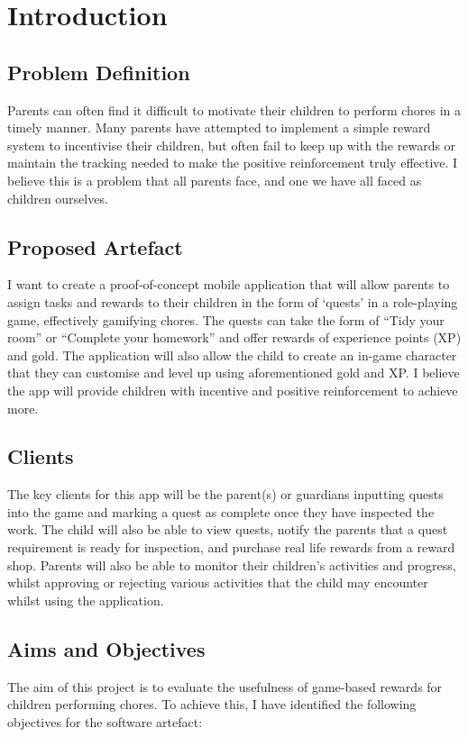 \chapter{Introduction}
\label{chap:intro}

\section{Problem Definition}
Parents can often find it difficult to motivate their children to perform chores in a timely manner. 
Many parents have attempted to implement a simple reward system to incentivise their children, but often fail to keep up with the rewards or maintain the tracking needed to make the positive reinforcement truly effective.
I believe this is a problem that all parents face, and one we have all faced as children ourselves.  

\section{Proposed Artefact}
I want to create a proof-of-concept mobile application that will allow parents to assign tasks and rewards to their children in the form of `quests' in a role-playing game, effectively gamifying chores. 
The quests can take the form of ``Tidy your room'' or ``Complete your homework'' and offer rewards of experience points (XP) and gold. The application will also allow the child to create an in-game character that they can customise and level up using aforementioned gold and XP.
I believe the app will provide children with incentive and positive reinforcement to achieve more.

\section{Clients}
The key clients for this app will be the parent(s) or guardians inputting quests into the game and marking a quest as complete once they have inspected the work. 
The child will also be able to view quests, notify the parents that a quest requirement is ready for inspection, and purchase real life rewards from a reward shop.
Parents will also be able to monitor their children's activities and progress, whilst approving or rejecting various activities that the child may encounter whilst using the application. 

\section{Aims and Objectives}
The aim of this project is to evaluate the usefulness of game-based rewards for children performing chores. 
To achieve this, I have identified the following objectives for the software artefact:

